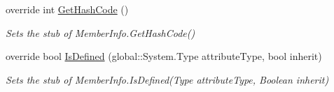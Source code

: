 \begin{DoxyCompactItemize}
override int \hyperlink{class_system_1_1_reflection_1_1_fakes_1_1_stub_member_info_a92ebf12d2d5255ff6ee63ea579ce10c2}{Get\-Hash\-Code} ()
\begin{DoxyCompactList}\small\item\em Sets the stub of Member\-Info.\-Get\-Hash\-Code()\end{DoxyCompactList}\item 
override bool \hyperlink{class_system_1_1_reflection_1_1_fakes_1_1_stub_member_info_a7fe2966967f2280a57b2e7df22eda5e7}{Is\-Defined} (global\-::\-System.\-Type attribute\-Type, bool inherit)
\begin{DoxyCompactList}\small\item\em Sets the stub of Member\-Info.\-Is\-Defined(\-Type attribute\-Type, Boolean inherit)\end{DoxyCompactList}\end{DoxyCompactItemize}
